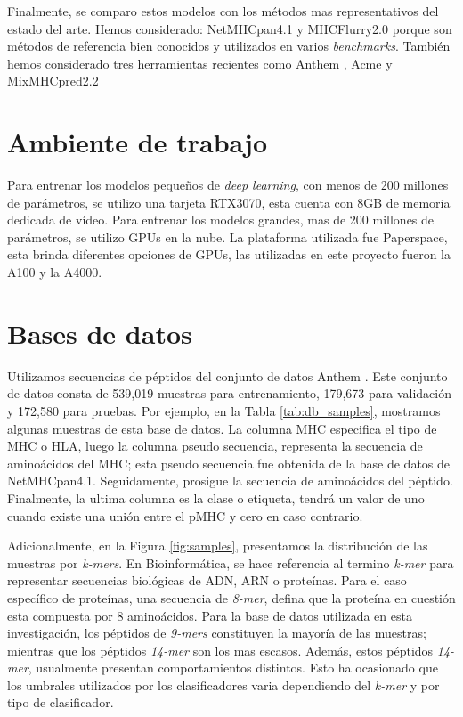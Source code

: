 Finalmente, se comparo estos modelos con los métodos mas representativos del estado del arte. Hemos considerado:  NetMHCpan4.1 \citep{reynisson2020netmhcpan} y MHCFlurry2.0 \citep{o2020mhcflurry} porque son métodos de referencia bien conocidos y utilizados en varios \textit{benchmarks}. También  hemos considerado tres herramientas recientes como Anthem \citep{mei2021anthem}, Acme \citep{hu2019acme} y MixMHCpred2.2 \citep{gfeller2023improved}


\section{Ambiente de trabajo}

Para entrenar los modelos pequeños de \textit{deep learning}, con menos de 200 millones de parámetros, se utilizo una tarjeta RTX3070, esta cuenta con 8GB de memoria dedicada de vídeo. Para entrenar los modelos grandes, mas de 200 millones de parámetros, se utilizo GPUs en la nube. La plataforma utilizada fue Paperspace, esta brinda diferentes opciones de GPUs, las utilizadas en este proyecto fueron la A100 y la A4000.

\section{Bases de datos}
Utilizamos secuencias de péptidos del conjunto de datos Anthem \citep{mei2021anthem}. Este conjunto de datos consta de 539,019 muestras para entrenamiento, 179,673 para validación y 172,580 para pruebas. Por ejemplo, en la Tabla \ref{tab:db_samples}, mostramos algunas muestras de esta base de datos. La columna MHC especifica el tipo de MHC o HLA, luego la columna pseudo secuencia, representa la secuencia de aminoácidos del MHC; esta pseudo secuencia fue obtenida de la base de datos de NetMHCpan4.1. Seguidamente, prosigue la secuencia de aminoácidos del péptido. Finalmente, la ultima columna es la clase o etiqueta, tendrá un valor de uno cuando existe una unión entre el pMHC y cero en caso contrario.


Adicionalmente, en la Figura \ref{fig:samples}, presentamos la distribución de las muestras por \textit{k-mers}. En Bioinformática, se hace referencia al termino \textit{k-mer} para representar secuencias biológicas de ADN, ARN o proteínas. Para el caso específico de proteínas, una secuencia de \textit{8-mer}, defina que la proteína en cuestión esta compuesta por 8 aminoácidos. Para la base de datos utilizada en esta investigación, los péptidos de \textit{9-mers} constituyen la mayoría de las muestras; mientras que los péptidos \textit{14-mer} son los mas escasos. Además, estos péptidos \textit{14-mer}, usualmente presentan comportamientos distintos. Esto ha ocasionado que los umbrales utilizados por los clasificadores varia dependiendo del \textit{k-mer} y por tipo de clasificador. 

